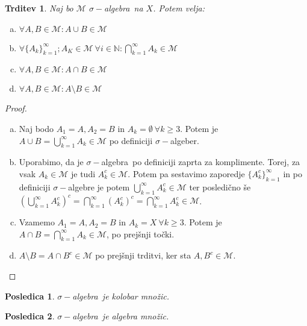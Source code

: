 \documentclass[a4paper, 10pt]{article}
\newtheorem{trditev}{Trditev}
\newtheorem{posl}{Posledica}
\newcommand{\mth}[1]{\ensuremath{\mathbb{#1}}}
\newcommand{\N}{\mth{N}}
\newcommand{\Mu}{\mathcal{M}}
\newcommand{\sigalg}{$\sigma-$algebra~}
\begin{document}
		\begin{trditev}
			Naj bo $\Mu$ \sigalg na $X$. Potem velja: \begin{enumerate}[a)]
				\item $\forall A, B\in \Mu: A\cup B \in \Mu$
				\item $\forall \{A_k\}_{k=1}^\infty; A_K\in\Mu~\forall i\in\N: \bigcap_{k = 1}^\infty A_k \in \Mu$
				\item $\forall A, B\in \Mu: A\cap B \in \Mu$
				\item $\forall A, B\in \Mu: A\setminus B \in \Mu$
			\end{enumerate}
		\end{trditev}
		\begin{proof}
			\begin{enumerate}[a)]
				\item Naj bodo $A_1 = A, A_2 = B$ in $A_k = \emptyset~\forall k \geq 3$. Potem je $A\cup B = \bigcup_{k = 1}^\infty A_k \in\Mu$ po definiciji $\sigma-$algeber.
				\item Uporabimo, da je \sigalg po definiciji zaprta za komplimente. Torej, za vsak $A_k \in \Mu$ je tudi $A_k^c \in \Mu$. Potem pa sestavimo zaporedje $\{A_k^c\}_{k=1}^\infty$ in po definiciji $\sigma-$algebre je potem $\bigcup_{k = 1}^\infty A_k^c \in \Mu$ ter posledično še $\left(\bigcup_{k = 1}^\infty A_k^c\right)^c = \bigcap_{k = 1}^\infty (A_k^c)^c = \bigcap_{k = 1}^\infty A_k^c \in \Mu$.
				\item Vzamemo $A_1 = A, A_2 = B$ in $A_k = X~\forall k\geq 3$. Potem je $A\cap B = \bigcap_{k = 1}^\infty A_k \in \Mu$, po prejšnji točki.
				\item $A\setminus B = A\cap B^c \in \Mu$ po prejšnji trditvi, ker sta $A, B^c \in \Mu$.
			\end{enumerate}
		\end{proof}
		\begin{posl}
			\sigalg je kolobar množic.
		\end{posl}
		\begin{posl}
			\sigalg je algebra množic.
		\end{posl}
		
		\newpage
		
\end{document}
